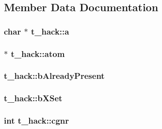 \subsection{\-Member \-Data \-Documentation}
\hypertarget{structt__hack_afce8a172eedc721f7a12b837e6416b10}{
\subsubsection[{a}]{\setlength{\rightskip}{0pt plus 5cm}char $\ast$ {\bf t\-\_\-hack\-::a}}}\label{structt__hack_afce8a172eedc721f7a12b837e6416b10}
\hypertarget{structt__hack_a33e8bdc90cfa045a4d2c3814199b2d03}{
\subsubsection[{atom}]{ $\ast$ {\bf t\-\_\-hack\-::atom}}}\label{structt__hack_a33e8bdc90cfa045a4d2c3814199b2d03}
\hypertarget{structt__hack_a7d98cf2a2e0ca843f3aa9baba6348212}{
\subsubsection[{b\-Already\-Present}]{ {\bf t\-\_\-hack\-::b\-Already\-Present}}}\label{structt__hack_a7d98cf2a2e0ca843f3aa9baba6348212}
\hypertarget{structt__hack_a66c1218327ab2ab45c98519238831ce7}{
\subsubsection[{b\-X\-Set}]{ {\bf t\-\_\-hack\-::b\-X\-Set}}}\label{structt__hack_a66c1218327ab2ab45c98519238831ce7}
\hypertarget{structt__hack_a4368826e977f7724de088e1565f964e4}{
\subsubsection[{cgnr}]{\setlength{\rightskip}{0pt plus 5cm}int {\bf t\-\_\-hack\-::cgnr}}}\label{structt__hack_a4368826e977f7724de088e1565f964e4}
